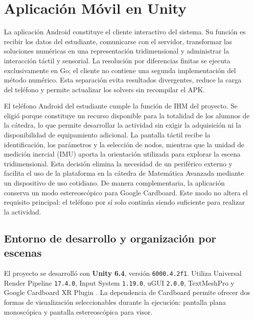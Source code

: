 
\section{Aplicación Móvil en Unity}

La aplicación Android constituye el cliente interactivo del sistema. Su función es
recibir los datos del estudiante, comunicarse con el servidor, transformar las
soluciones numéricas en una representación tridimensional y administrar la interacción
táctil y sensorial. La resolución por diferencias finitas se ejecuta exclusivamente en
Go; el cliente no contiene una segunda implementación del método numérico. Esta
separación evita resultados divergentes, reduce la carga del teléfono y permite
actualizar los solvers sin recompilar el APK.

El teléfono Android del estudiante cumple la función de IHM del proyecto. Se eligió
porque constituye un recurso disponible
para la totalidad de los alumnos de la cátedra, lo que permite desarrollar la actividad
sin exigir la adquisición ni la disponibilidad de equipamiento adicional. La pantalla
táctil recibe la identificación, los parámetros y la selección de nodos, mientras que
la unidad de medición inercial (IMU) aporta la orientación utilizada para explorar la
escena tridimensional. Esta decisión elimina la necesidad de un periférico externo y
facilita el uso de la plataforma en la cátedra de Matemática Avanzada mediante un
dispositivo de uso cotidiano. De manera complementaria, la aplicación conserva un
modo estereoscópico para Google Cardboard. Este modo no altera el requisito principal:
el teléfono por sí solo continúa siendo suficiente para realizar la actividad.

\subsection{Entorno de desarrollo y organización por escenas}

El proyecto se desarrolló con \textbf{Unity 6.4}, versión
\texttt{6000.4.2f1}. Utiliza Universal Render Pipeline \texttt{17.4.0}, Input System
\texttt{1.19.0}, uGUI \texttt{2.0.0}, TextMeshPro y Google Cardboard XR Plugin
\cite{unityManual,cardboardQuickstart}. La
dependencia de Cardboard permite ofrecer dos formas de visualización seleccionables
durante la ejecución: pantalla plana monoscópica y pantalla estereoscópica para visor.

